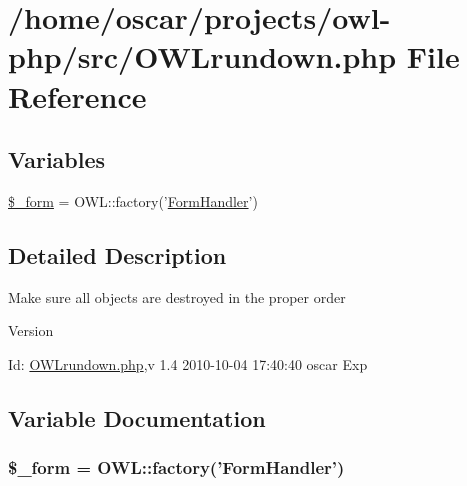 \section{/home/oscar/projects/owl-\/php/src/OWLrundown.php File Reference}
\label{OWLrundown_8php}
\subsection*{Variables}
\begin{DoxyCompactItemize}
\item 
\hyperlink{OWLrundown_8php_ab14b242803551e0f269742a7103f149d}{\$\_\-form} = OWL::factory('\hyperlink{classFormHandler}{FormHandler}')
\end{DoxyCompactItemize}


\subsection{Detailed Description}
Make sure all objects are destroyed in the proper order \begin{DoxyVersion}{Version}

\end{DoxyVersion}
\begin{DoxyParagraph}{Id:}
\hyperlink{OWLrundown_8php}{OWLrundown.php},v 1.4 2010-\/10-\/04 17:40:40 oscar Exp 
\end{DoxyParagraph}


\subsection{Variable Documentation}
\subsubsection[{\$\_\-form}]{\setlength{\rightskip}{0pt plus 5cm}\$\_\-form = OWL::factory('{\bf FormHandler}')}\label{OWLrundown_8php_ab14b242803551e0f269742a7103f149d}
